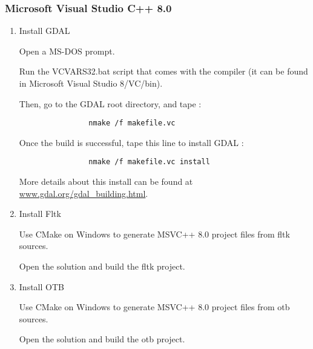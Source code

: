 \subsubsection{Microsoft Visual Studio C++ 8.0}
\begin{enumerate}
\item Install GDAL

        Open a MS-DOS prompt.
        
        Run the VCVARS32.bat script that comes with the compiler (it can be found in 
        Microsoft Visual Studio 8/VC/bin).
        
        Then, go to the GDAL root directory, and tape : 
        \begin{verbatim}
                nmake /f makefile.vc
        \end{verbatim}
        
        Once the build is successful, tape this line to install GDAL :
        \begin{verbatim}
                nmake /f makefile.vc install
        \end{verbatim}
	
        More details about this install can be found at \url{www.gdal.org/gdal_building.html}.
                
        
\item Install Fltk

	Use CMake on Windows to generate MSVC++ 8.0 project files from fltk sources.
	
	Open the solution and build the fltk project.

\item Install OTB

	Use CMake on Windows to generate MSVC++ 8.0 project files from otb sources.
	
	Open the solution and build the otb project.

\end{enumerate}

